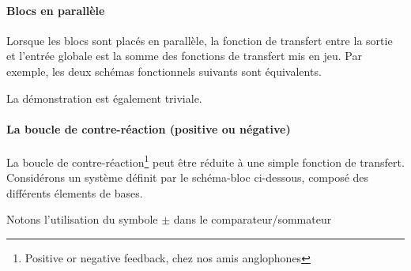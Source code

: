 \paragraph{Blocs en parallèle} 

Lorsque les blocs sont placés en parallèle, la fonction de transfert 
entre la sortie et l'entrée globale est la somme des fonctions de transfert mis en jeu.
Par exemple, les deux schémas fonctionnels suivants sont équivalents.

\begin{center}

\end{center}

La démonstration est également triviale.

\paragraph{La boucle de contre-réaction (positive ou négative)}

La boucle de contre-réaction\footnote{\og Positive or negative feedback\fg, chez nos 
amis anglophones} peut 
être réduite à une simple fonction de transfert.
Considérons un système définit par le schéma-bloc ci-dessous, composé des différents élements de bases.

\begin{center}
\end{center}
Notons l'utilisation du symbole $\pm$ dans le comparateur/sommateur

